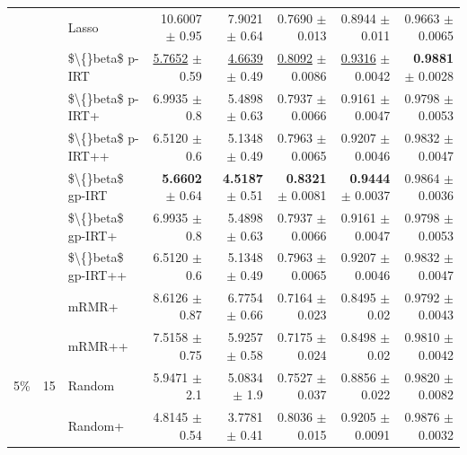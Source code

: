 \begin{longtable}{llp{}rrrrr}
 &  & Lasso & 10.6007 {\scriptsize $\pm$ 0.95} & 7.9021 {\scriptsize $\pm$ 0.64} & 0.7690 {\scriptsize $\pm$ 0.013} & 0.8944 {\scriptsize $\pm$ 0.011} & 0.9663 {\scriptsize $\pm$ 0.0065} \\
 &  & \$\textbackslash\{\}beta\$ p-IRT & \underline{5.7652} {\scriptsize $\pm$ 0.59} & \underline{4.6639} {\scriptsize $\pm$ 0.49} & \underline{0.8092} {\scriptsize $\pm$ 0.0086} & \underline{0.9316} {\scriptsize $\pm$ 0.0042} & \textbf{0.9881} {\scriptsize $\pm$ 0.0028} \\
 &  & \$\textbackslash\{\}beta\$ p-IRT+ & 6.9935 {\scriptsize $\pm$ 0.8} & 5.4898 {\scriptsize $\pm$ 0.63} & 0.7937 {\scriptsize $\pm$ 0.0066} & 0.9161 {\scriptsize $\pm$ 0.0047} & 0.9798 {\scriptsize $\pm$ 0.0053} \\
 &  & \$\textbackslash\{\}beta\$ p-IRT++ & 6.5120 {\scriptsize $\pm$ 0.6} & 5.1348 {\scriptsize $\pm$ 0.49} & 0.7963 {\scriptsize $\pm$ 0.0065} & 0.9207 {\scriptsize $\pm$ 0.0046} & 0.9832 {\scriptsize $\pm$ 0.0047} \\
 &  & \$\textbackslash\{\}beta\$ gp-IRT & \textbf{5.6602} {\scriptsize $\pm$ 0.64} & \textbf{4.5187} {\scriptsize $\pm$ 0.51} & \textbf{0.8321} {\scriptsize $\pm$ 0.0081} & \textbf{0.9444} {\scriptsize $\pm$ 0.0037} & 0.9864 {\scriptsize $\pm$ 0.0036} \\
 &  & \$\textbackslash\{\}beta\$ gp-IRT+ & 6.9935 {\scriptsize $\pm$ 0.8} & 5.4898 {\scriptsize $\pm$ 0.63} & 0.7937 {\scriptsize $\pm$ 0.0066} & 0.9161 {\scriptsize $\pm$ 0.0047} & 0.9798 {\scriptsize $\pm$ 0.0053} \\
 &  & \$\textbackslash\{\}beta\$ gp-IRT++ & 6.5120 {\scriptsize $\pm$ 0.6} & 5.1348 {\scriptsize $\pm$ 0.49} & 0.7963 {\scriptsize $\pm$ 0.0065} & 0.9207 {\scriptsize $\pm$ 0.0046} & 0.9832 {\scriptsize $\pm$ 0.0047} \\
 &  & mRMR+ & 8.6126 {\scriptsize $\pm$ 0.87} & 6.7754 {\scriptsize $\pm$ 0.66} & 0.7164 {\scriptsize $\pm$ 0.023} & 0.8495 {\scriptsize $\pm$ 0.02} & 0.9792 {\scriptsize $\pm$ 0.0043} \\
 &  & mRMR++ & 7.5158 {\scriptsize $\pm$ 0.75} & 5.9257 {\scriptsize $\pm$ 0.58} & 0.7175 {\scriptsize $\pm$ 0.024} & 0.8498 {\scriptsize $\pm$ 0.02} & 0.9810 {\scriptsize $\pm$ 0.0042} \\
\midrule
5\% & 15 & Random & 5.9471 {\scriptsize $\pm$ 2.1} & 5.0834 {\scriptsize $\pm$ 1.9} & 0.7527 {\scriptsize $\pm$ 0.037} & 0.8856 {\scriptsize $\pm$ 0.022} & 0.9820 {\scriptsize $\pm$ 0.0082} \\
 &  & Random+ & 4.8145 {\scriptsize $\pm$ 0.54} & 3.7781 {\scriptsize $\pm$ 0.41} & 0.8036 {\scriptsize $\pm$ 0.015} & 0.9205 {\scriptsize $\pm$ 0.0091} & 0.9876 {\scriptsize $\pm$ 0.0032} \\

\end{longtable}
